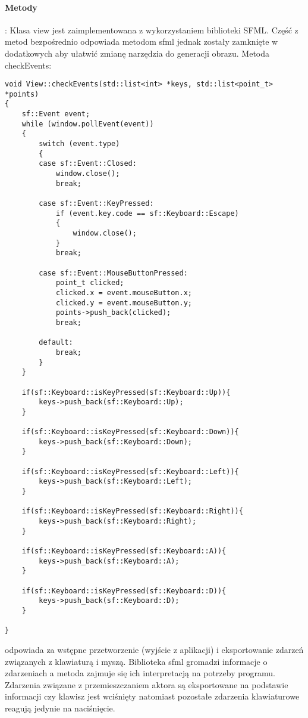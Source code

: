 \documentclass[11pt, a4paper]{article}
\begin{document}
\paragraph{Metody}: 
Klasa view jest zaimplementowana z wykorzystaniem biblioteki SFML. Część z metod bezpośrednio odpowiada metodom sfml
jednak zostały zamknięte w dodatkowych aby ułatwić zmianę narzędzia do generacji obrazu.
\newline
Metoda checkEvents:
\begin{lstlisting}
void View::checkEvents(std::list<int> *keys, std::list<point_t> *points)
{
    sf::Event event;
    while (window.pollEvent(event))
    {
        switch (event.type)
        {
        case sf::Event::Closed:
            window.close();
            break;

        case sf::Event::KeyPressed:
            if (event.key.code == sf::Keyboard::Escape)
            {
                window.close();
            }
            break;

        case sf::Event::MouseButtonPressed:
            point_t clicked;
            clicked.x = event.mouseButton.x;
            clicked.y = event.mouseButton.y;
            points->push_back(clicked);
            break;

        default:
            break;
        }
    }

    if(sf::Keyboard::isKeyPressed(sf::Keyboard::Up)){
        keys->push_back(sf::Keyboard::Up);
    }

    if(sf::Keyboard::isKeyPressed(sf::Keyboard::Down)){
        keys->push_back(sf::Keyboard::Down);
    }

    if(sf::Keyboard::isKeyPressed(sf::Keyboard::Left)){
        keys->push_back(sf::Keyboard::Left);
    }

    if(sf::Keyboard::isKeyPressed(sf::Keyboard::Right)){
        keys->push_back(sf::Keyboard::Right);
    }

    if(sf::Keyboard::isKeyPressed(sf::Keyboard::A)){
        keys->push_back(sf::Keyboard::A);
    }

    if(sf::Keyboard::isKeyPressed(sf::Keyboard::D)){
        keys->push_back(sf::Keyboard::D);
    }

}
\end{lstlisting}
odpowiada za wstępne przetworzenie (wyjście z aplikacji) i eksportowanie zdarzeń związanych z klawiaturą i myszą. Biblioteka 
sfml gromadzi informacje o zdarzeniach a metoda zajmuje się ich interpretacją na potrzeby programu. Zdarzenia związane z przemieszczaniem aktora 
są eksportowane na podstawie informacji czy klawisz jest wciśnięty natomiast pozostałe zdarzenia klawiaturowe reagują jedynie na naciśnięcie. 
\end{document}
